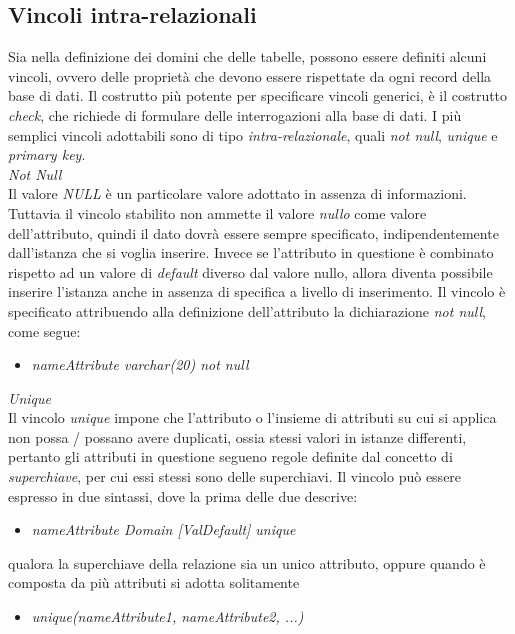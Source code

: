 \documentclass{article}
\begin{document}
\subsection*{Vincoli intra-relazionali}
\large
Sia nella definizione dei domini che delle tabelle, possono essere definiti alcuni vincoli, ovvero delle proprietà che devono essere rispettate da ogni record della base di dati. Il costrutto più potente per specificare vincoli generici, è il costrutto \textit{check}, che richiede di formulare delle interrogazioni alla base di dati. I più semplici vincoli adottabili sono di tipo \textit{intra-relazionale}, quali \textit{not null}, \textit{unique} e \textit{primary key}.\vspace*{14pt}\\
\textit{Not Null}\\Il valore \textit{NULL} è un particolare valore adottato in assenza di informazioni. Tuttavia il vincolo stabilito non ammette il valore \textit{nullo} come valore dell'attributo, quindi il dato dovrà essere sempre specificato, indipendentemente dall'istanza che si voglia inserire. Invece se l'attributo in questione è combinato rispetto ad un valore di \textit{default} diverso dal valore nullo, allora diventa possibile inserire l'istanza anche in assenza di specifica a livello di inserimento. Il vincolo è specificato attribuendo alla definizione dell'attributo la dichiarazione \textit{not null}, come segue:
\begin{itemize}[label={ }, leftmargin=1cm]
    \itemsep0em
    \item \textit{nameAttribute varchar(20) not null}
\end{itemize}
\textit{Unique}\\Il vincolo \textit{unique} impone che l'attributo o l'insieme di attributi su cui si applica non possa / possano avere duplicati, ossia stessi valori in istanze differenti, pertanto gli attributi in questione segueno regole definite dal concetto di \textit{superchiave}, per cui essi stessi sono delle superchiavi. Il vincolo può essere espresso in due sintassi, dove la prima delle due descrive:
\begin{itemize}[label={ }, leftmargin=1cm]
    \item \textit{nameAttribute Domain [ValDefault] unique}
\end{itemize}
qualora la superchiave della relazione sia un unico attributo, oppure quando è composta da più attributi si adotta solitamente
\begin{itemize}[label={ }, leftmargin=1cm]
    \item \textit{unique(nameAttribute1, nameAttribute2, ...)}
\end{itemize}
\end{document}
